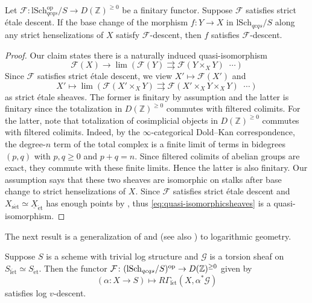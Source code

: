 \documentclass[10pt]{amsart}
\newcommand{\Z}{\mathbb{Z}}
\newcommand{\cF}{\mathcal{F}}
\newcommand{\cG}{\mathcal{G}}
\newcommand{\ul}{\underline}
\newcommand{\set}{\mathrm{s\acute{e}t}}
\newcommand{\et}{\mathrm{\acute{e}t}}
\newcommand{\letale}{\mathrm{l\acute{e}t}}
\newcommand{\lSch}{\mathrm{lSch}}
\DeclareMathOperator{\rightrightrightarrows}{\substack{\rightarrow \\[-1em] \rightarrow \\[-1em] \rightarrow}}
\begin{document}
\begin{lemma}\label{lem:5.1}
Let $\cF \colon \lSch_{qcqs}^{\text{op}}/S \to D(\Z)^{\geq 0}$ be a finitary functor. 
Suppose $\cF$ satisfies strict étale descent. 
If the base change of the morphism $f\colon Y \to X$ in $\lSch_{qcqs}/S$ along 
any strict henselizations of $X$ satisfy $\cF$-descent, 
then $f$ satisfies $\cF$-descent.
\end{lemma}
\begin{proof}
Our claim states there is a naturally induced quasi-isomorphism 
\begin{equation}\label{eq:quasi-isomorphicsheaves}
\cF(X) \to \lim \left( \cF(Y) \rightrightarrows \cF(Y \times_X Y) \rightrightrightarrows\cdots \right)
\end{equation}
Since $\cF$ satisfies strict étale descent, we view 
$X'\mapsto \cF(X')$ and 
$$X' \mapsto \lim \left( \cF(X'\times_X Y) \rightrightarrows \cF(X'\times_X Y \times_X Y)
\rightrightrightarrows
\cdots \right)$$ 
as strict \'etale sheaves.
The former is finitary by assumption and the latter is finitary since the totalization in 
$D(\Z)^{\geq 0}$ commutes with filtered colimits.
For the latter, 
note that totalization of cosimplicial objects in $D(\mathbb{Z})^{\ge 0}$ commutes with filtered colimits. 
Indeed, by the $\infty$-categorical Dold--Kan correspondence, 
the degree-$n$ term of the total complex is a finite limit of terms in bidegrees $(p,q)$ with $p,q\ge 0$ and $p+q=n$. Since filtered colimits of abelian groups are exact, 
they commute with these finite limits. 
Hence the latter is also finitary.
Our assumption says that these two sheaves are isomorphic on stalks after base change to 
strict henselizations of $X$. 
Since $\cF$ satisfies strict étale descent 
and $X_{\set}\simeq \ul{X}_\et$ has enough points by \cite[Tag 03PU]{stacks-project},
thus \eqref{eq:quasi-isomorphicsheaves} is a quasi-isomorphism.
\end{proof}


The next result is a generalization of \cite[Exposé Vbis]{SGA4} and \cite[Proposition 5.3.3]{CDEtale} 
(see also \cite[Proposition 5.2]{MR4278670}) to logarithmic geometry.

\begin{theorem} 
\label{thm:etalecohomology}
Suppose $S$ is a scheme with trivial log structure and $\cG$ is a torsion sheaf on 
$S_{\letale}\simeq S_{\et}$.
Then the functor $\cF \colon (\lSch_{qcqs}/S)^{\textnormal{op}} \to D(\Z)^{\geq 0}$ given by
\[
(\alpha \colon X \to S)
\mapsto
R\Gamma_{\letale}(X,\alpha^*\cG)
\]
satisfies log $v$-descent.
\end{theorem}
\end{document}

